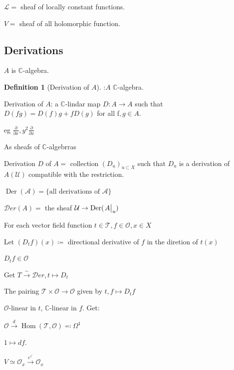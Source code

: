 \documentclass{article}
\theoremstyle{definition}
\newtheorem*{definition}{Definition}
\begin{document}
    \(\mathcal{L} =\) sheaf of  locally constant functions. 

    \(V =\) sheaf of all holomorphic function.

    \subsection*{Derivations}

    \(A\) is \(\mathbb{C}\)-algebra.

    \begin{definition}
        [Derivation of \(A\)]:\(A\) \(\mathbb{C}\)-algebra.

        Derivation of \(A\): a \(\mathbb{C}\)-lindar map \(D: A \to A\) such that \(D(fg) = D(f)g + f D(g)\) for all f\(,g\in A\).


        eg \(\frac{\partial}{\partial x}, y^2 \frac{\partial}{\partial x}\) 

    \end{definition}

    As sheafs of \(\mathbb{C}\)-algebrras

    Derivation \(D\) of \(A =\) collection \((D_u)_{u \subset X}\) such that \(D_u\) is a derivation of \(A(\mathcal{U})\) compatible with the restriction.

    \(\operatorname{Der} (\mathcal{A}) = \{ \text{all derivations of } \mathcal{A} \}   \)
    
    \(\mathscr{D}er(A) = \) the sheaf \(\mathcal{U}\to \operatorname{Der}(\eval{A}_u)\)  

    For each vector field function \(t\in \mathcal{T} , f\in \mathcal{O} , x\in X\) 

    Let \((D_t f)(x) \coloneqq\) directional derivative of \(f\) in the diretion of \(t(x)\) 

    \(D_t f \in \mathcal{O}\) 

    Get \(T \xrightarrow{\sim} \mathscr{D}er, t \mapsto D_t\) 

    The pairing \(\mathcal{T} \times \mathcal{O} \to \mathcal{O}\) given by \(t, f \mapsto D_t f\)
    
    \(\mathcal{O}\)-linear in \(t\), \(\mathbb{C}\)-linear in \(f\). Get:

    \(\mathcal{O} \xrightarrow{d} \operatorname{Hom}(\mathcal{T} , \mathcal{O}) \eqqcolon \Omega^1\)
    
    \(1 \mapsto df\).

    \(V \simeq \mathcal{O}_x \xrightarrow{e^{z^{\prime}}} \mathcal{O}_x\) 
\end{document}

